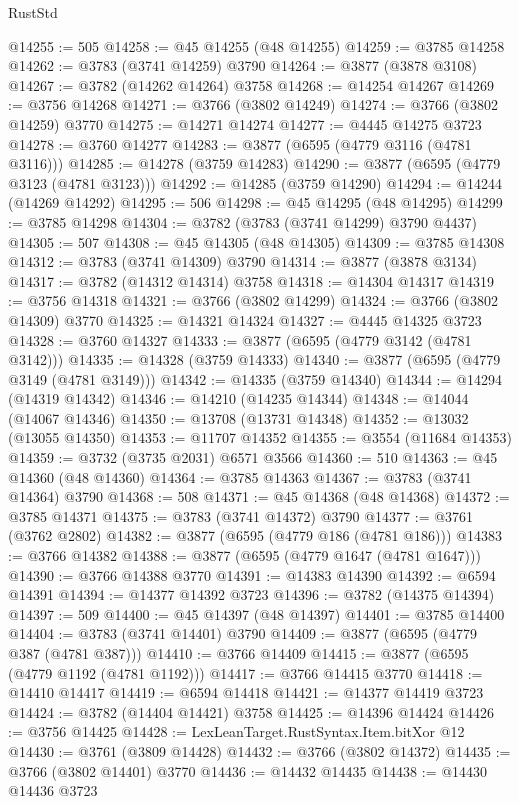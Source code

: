 \begin{lexlean}{RustStd}
\begin{coremodule}
@14255 := 505
@14258 := @45 @14255 (@48 @14255)
@14259 := @3785 @14258
@14262 := @3783 (@3741 @14259) @3790
@14264 := @3877 (@3878 @3108)
@14267 := @3782 (@14262 @14264) @3758
@14268 := @14254 @14267
@14269 := @3756 @14268
@14271 := @3766 (@3802 @14249)
@14274 := @3766 (@3802 @14259) @3770
@14275 := @14271 @14274
@14277 := @4445 @14275 @3723
@14278 := @3760 @14277
@14283 := @3877 (@6595 (@4779 @3116 (@4781 @3116)))
@14285 := @14278 (@3759 @14283)
@14290 := @3877 (@6595 (@4779 @3123 (@4781 @3123)))
@14292 := @14285 (@3759 @14290)
@14294 := @14244 (@14269 @14292)
@14295 := 506
@14298 := @45 @14295 (@48 @14295)
@14299 := @3785 @14298
@14304 := @3782 (@3783 (@3741 @14299) @3790 @4437)
@14305 := 507
@14308 := @45 @14305 (@48 @14305)
@14309 := @3785 @14308
@14312 := @3783 (@3741 @14309) @3790
@14314 := @3877 (@3878 @3134)
@14317 := @3782 (@14312 @14314) @3758
@14318 := @14304 @14317
@14319 := @3756 @14318
@14321 := @3766 (@3802 @14299)
@14324 := @3766 (@3802 @14309) @3770
@14325 := @14321 @14324
@14327 := @4445 @14325 @3723
@14328 := @3760 @14327
@14333 := @3877 (@6595 (@4779 @3142 (@4781 @3142)))
@14335 := @14328 (@3759 @14333)
@14340 := @3877 (@6595 (@4779 @3149 (@4781 @3149)))
@14342 := @14335 (@3759 @14340)
@14344 := @14294 (@14319 @14342)
@14346 := @14210 (@14235 @14344)
@14348 := @14044 (@14067 @14346)
@14350 := @13708 (@13731 @14348)
@14352 := @13032 (@13055 @14350)
@14353 := @11707 @14352
@14355 := @3554 (@11684 @14353)
@14359 := @3732 (@3735 @2031) @6571 @3566
@14360 := 510
@14363 := @45 @14360 (@48 @14360)
@14364 := @3785 @14363
@14367 := @3783 (@3741 @14364) @3790
@14368 := 508
@14371 := @45 @14368 (@48 @14368)
@14372 := @3785 @14371
@14375 := @3783 (@3741 @14372) @3790
@14377 := @3761 (@3762 @2802)
@14382 := @3877 (@6595 (@4779 @186 (@4781 @186)))
@14383 := @3766 @14382
@14388 := @3877 (@6595 (@4779 @1647 (@4781 @1647)))
@14390 := @3766 @14388 @3770
@14391 := @14383 @14390
@14392 := @6594 @14391
@14394 := @14377 @14392 @3723
@14396 := @3782 (@14375 @14394)
@14397 := 509
@14400 := @45 @14397 (@48 @14397)
@14401 := @3785 @14400
@14404 := @3783 (@3741 @14401) @3790
@14409 := @3877 (@6595 (@4779 @387 (@4781 @387)))
@14410 := @3766 @14409
@14415 := @3877 (@6595 (@4779 @1192 (@4781 @1192)))
@14417 := @3766 @14415 @3770
@14418 := @14410 @14417
@14419 := @6594 @14418
@14421 := @14377 @14419 @3723
@14424 := @3782 (@14404 @14421) @3758
@14425 := @14396 @14424
@14426 := @3756 @14425
@14428 := LexLeanTarget.RustSyntax.Item.bitXor @12
@14430 := @3761 (@3809 @14428)
@14432 := @3766 (@3802 @14372)
@14435 := @3766 (@3802 @14401) @3770
@14436 := @14432 @14435
@14438 := @14430 @14436 @3723

\end{coremodule}
\end{lexlean}
